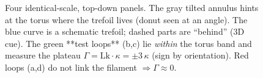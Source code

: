 {\begin{figure}[t]
{%
}

\hspace{0.9cm}
\hspace{0.9cm}
\hspace{0.9cm}

\caption{Four identical-scale, top-down panels. The gray tilted annulus hints at the torus where the trefoil lives (donut seen at an angle).
The blue curve is a schematic trefoil; dashed parts are “behind” (3D cue).
The green **test loops** (b,c) lie \emph{within} the torus band and measure the plateau \(\Gamma=\mathrm{Lk}\cdot\kappa=\pm 3\,\kappa\) (sign by orientation).
Red loops (a,d) do not link the filament \(\Rightarrow \Gamma\approx 0\).}
\label{fig:fourpanel-3D-cartoon}
\end{figure}
}

